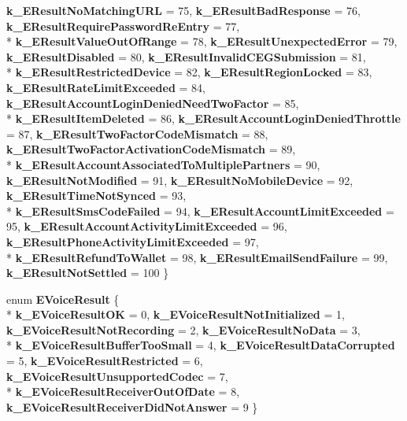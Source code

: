 \begin{DoxyCompactItemize}
{\bfseries k\+\_\+\+E\+Result\+No\+Matching\+U\+R\+L} = 75, 
{\bfseries k\+\_\+\+E\+Result\+Bad\+Response} = 76, 
{\bfseries k\+\_\+\+E\+Result\+Require\+Password\+Re\+Entry} = 77, 
\\*
{\bfseries k\+\_\+\+E\+Result\+Value\+Out\+Of\+Range} = 78, 
{\bfseries k\+\_\+\+E\+Result\+Unexpected\+Error} = 79, 
{\bfseries k\+\_\+\+E\+Result\+Disabled} = 80, 
{\bfseries k\+\_\+\+E\+Result\+Invalid\+C\+E\+G\+Submission} = 81, 
\\*
{\bfseries k\+\_\+\+E\+Result\+Restricted\+Device} = 82, 
{\bfseries k\+\_\+\+E\+Result\+Region\+Locked} = 83, 
{\bfseries k\+\_\+\+E\+Result\+Rate\+Limit\+Exceeded} = 84, 
{\bfseries k\+\_\+\+E\+Result\+Account\+Login\+Denied\+Need\+Two\+Factor} = 85, 
\\*
{\bfseries k\+\_\+\+E\+Result\+Item\+Deleted} = 86, 
{\bfseries k\+\_\+\+E\+Result\+Account\+Login\+Denied\+Throttle} = 87, 
{\bfseries k\+\_\+\+E\+Result\+Two\+Factor\+Code\+Mismatch} = 88, 
{\bfseries k\+\_\+\+E\+Result\+Two\+Factor\+Activation\+Code\+Mismatch} = 89, 
\\*
{\bfseries k\+\_\+\+E\+Result\+Account\+Associated\+To\+Multiple\+Partners} = 90, 
{\bfseries k\+\_\+\+E\+Result\+Not\+Modified} = 91, 
{\bfseries k\+\_\+\+E\+Result\+No\+Mobile\+Device} = 92, 
{\bfseries k\+\_\+\+E\+Result\+Time\+Not\+Synced} = 93, 
\\*
{\bfseries k\+\_\+\+E\+Result\+Sms\+Code\+Failed} = 94, 
{\bfseries k\+\_\+\+E\+Result\+Account\+Limit\+Exceeded} = 95, 
{\bfseries k\+\_\+\+E\+Result\+Account\+Activity\+Limit\+Exceeded} = 96, 
{\bfseries k\+\_\+\+E\+Result\+Phone\+Activity\+Limit\+Exceeded} = 97, 
\\*
{\bfseries k\+\_\+\+E\+Result\+Refund\+To\+Wallet} = 98, 
{\bfseries k\+\_\+\+E\+Result\+Email\+Send\+Failure} = 99, 
{\bfseries k\+\_\+\+E\+Result\+Not\+Settled} = 100
 \}\label{namespaceValve_1_1Steamworks_ac9a06628ca2b4adbfebbcfb3a54c40ca}

\item 
\hypertarget{namespaceValve_1_1Steamworks_a328dee63741e7399afa267adf134f116}{}enum {\bfseries E\+Voice\+Result} \{ \\*
{\bfseries k\+\_\+\+E\+Voice\+Result\+O\+K} = 0, 
{\bfseries k\+\_\+\+E\+Voice\+Result\+Not\+Initialized} = 1, 
{\bfseries k\+\_\+\+E\+Voice\+Result\+Not\+Recording} = 2, 
{\bfseries k\+\_\+\+E\+Voice\+Result\+No\+Data} = 3, 
\\*
{\bfseries k\+\_\+\+E\+Voice\+Result\+Buffer\+Too\+Small} = 4, 
{\bfseries k\+\_\+\+E\+Voice\+Result\+Data\+Corrupted} = 5, 
{\bfseries k\+\_\+\+E\+Voice\+Result\+Restricted} = 6, 
{\bfseries k\+\_\+\+E\+Voice\+Result\+Unsupported\+Codec} = 7, 
\\*
{\bfseries k\+\_\+\+E\+Voice\+Result\+Receiver\+Out\+Of\+Date} = 8, 
{\bfseries k\+\_\+\+E\+Voice\+Result\+Receiver\+Did\+Not\+Answer} = 9
 \}\label{namespaceValve_1_1Steamworks_a328dee63741e7399afa267adf134f116}


\end{DoxyCompactItemize}
